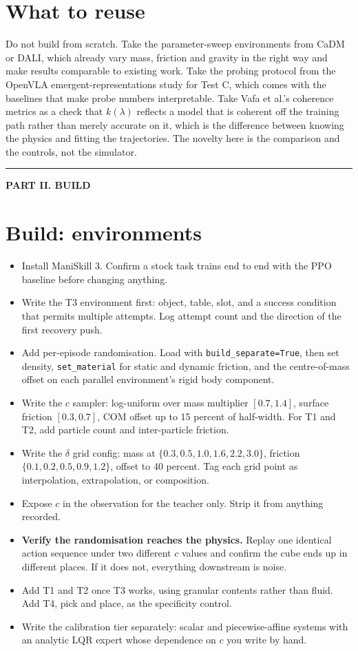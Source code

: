 \documentclass[9pt]{extarticle}
\newcommand{\ck}{\item[$\square$]}
\begin{document}
\section{What to reuse}

Do not build from scratch. Take the parameter-sweep environments from CaDM or DALI, which already vary mass, friction and gravity in the right way and make results comparable to existing work. Take the probing protocol from the OpenVLA emergent-representations study for Test C, which comes with the baselines that make probe numbers interpretable. Take Vafa et al.'s coherence metrics as a check that $k(\lambda)$ reflects a model that is coherent off the training path rather than merely accurate on it, which is the difference between knowing the physics and fitting the trajectories. The novelty here is the comparison and the controls, not the simulator.


\begin{center}\rule{0.35\textwidth}{0.4pt}\end{center}
\begin{center}{\small\bfseries PART II. BUILD}\end{center}

\section{Build: environments}

\begin{itemize}
\ck Install ManiSkill 3. Confirm a stock task trains end to end with the PPO baseline before changing anything.
\ck Write the T3 environment first: object, table, slot, and a success condition that permits multiple attempts. Log attempt count and the direction of the first recovery push.
\ck Add per-episode randomisation. Load with \texttt{build\_separate=True}, then set density, \texttt{set\_material} for static and dynamic friction, and the centre-of-mass offset on each parallel environment's rigid body component.
\ck Write the $c$ sampler: log-uniform over mass multiplier $[0.7, 1.4]$, surface friction $[0.3, 0.7]$, COM offset up to 15 percent of half-width. For T1 and T2, add particle count and inter-particle friction.
\ck Write the $\delta$ grid config: mass at $\{0.3, 0.5, 1.0, 1.6, 2.2, 3.0\}$, friction $\{0.1, 0.2, 0.5, 0.9, 1.2\}$, offset to 40 percent. Tag each grid point as interpolation, extrapolation, or composition.
\ck Expose $c$ in the observation for the teacher only. Strip it from anything recorded.
\ck \textbf{Verify the randomisation reaches the physics.} Replay one identical action sequence under two different $c$ values and confirm the cube ends up in different places. If it does not, everything downstream is noise.
\ck Add T1 and T2 once T3 works, using granular contents rather than fluid. Add T4, pick and place, as the specificity control.
\ck Write the calibration tier separately: scalar and piecewise-affine systems with an analytic LQR expert whose dependence on $c$ you write by hand.
\end{itemize}
\end{document}
